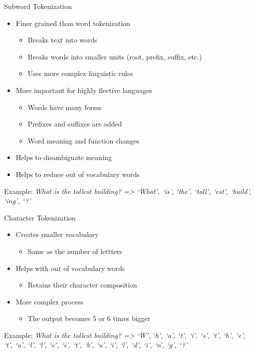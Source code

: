 \documentclass[11pt,compress,t,notes=noshow, xcolor=table]{beamer}
\begin{document}
\begin{vbframe}{Subword Tokenization}

\vfill

\begin{itemize}
	\item Finer grained than word tokenization
		\begin{itemize}
			\item Breaks text into words
			\item Breaks words into smaller units (root, prefix, suffix, etc.)
			\item Uses more complex linguistic rules
		\end{itemize}
	\item More important for highly flective languages
		\begin{itemize}
			\item Words have many forms
			\item Prefixes and suffixes are added
			\item Word meaning and function changes
		\end{itemize}
	\item Helps to disambiguate meaning 
	\item Helps to reduce out of vocabulary words
\end{itemize}

\vskip5mm
Example: \vskip3mm 
{\small\it What is the tallest building? => `What', `is', `the', `tall', `est', `build', `ing', `?'}

\vfill

\end{vbframe}


\begin{vbframe}{Character Tokenization}

\vfill

\begin{itemize}
	\item Creates smaller vocabulary
		\begin{itemize}
			\item Same as the number of lettters
		\end{itemize}
	\item Helps with out of vocabulary words
		\begin{itemize}
			\item Retains their character composition
		\end{itemize}
	\item More complex process
		\begin{itemize}
			\item The output becomes 5 or 6 times bigger
		\end{itemize}
\end{itemize}

\vskip5mm
Example: \vskip3mm 
{\small\it What is the tallest building? => `W', `h', `a', `t', `i', `s', `t', `h', `e', `t', `a', `l', `l', `e', `s', `t', `b', `u', `i', `l', `d', `i', `n', `g', `?'}

\vfill

\end{vbframe}
\end{document}

